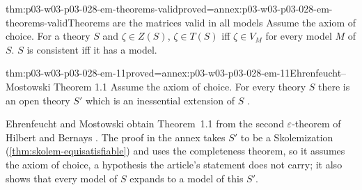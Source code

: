 \begin{hblemma}{thm:p03-w03-p03-028-em-theorems-valid}{proved=annex:p03-w03-p03-028-em-theorems-valid}{Theorems are the matrices valid in all models}
Assume the axiom of choice.  For a theory \(S\) and \(\zeta\in Z(S)\),
\(\zeta\in T(S)\) iff \(\zeta\in V_M\) for every model \(M\) of \(S\).  \(S\)
is consistent iff it has a model.
\end{hblemma}

\begin{hbtheorem}{thm:p03-w03-p03-028-em-11}{proved=annex:p03-w03-p03-028-em-11}{Ehrenfeucht--Mostowski Theorem 1.1}
Assume the axiom of choice.  For every theory \(S\) there is an open theory
\(S'\) which is an inessential extension of \(S\)
\cite[Theorem~1.1, p.~52]{EhrenfeuchtMostowski1956}.
\end{hbtheorem}

Ehrenfeucht and Mostowski obtain Theorem~1.1 from the second
\(\varepsilon\)-theorem of Hilbert and Bernays
\cite[p.~52]{EhrenfeuchtMostowski1956}.  The proof in the annex takes \(S'\) to
be a Skolemization (\cref{thm:skolem-equisatisfiable}) and uses the completeness
theorem, so it assumes the axiom of choice, a hypothesis the article's
statement does not carry; it also shows that every model of \(S\) expands to
a model of this \(S'\).

